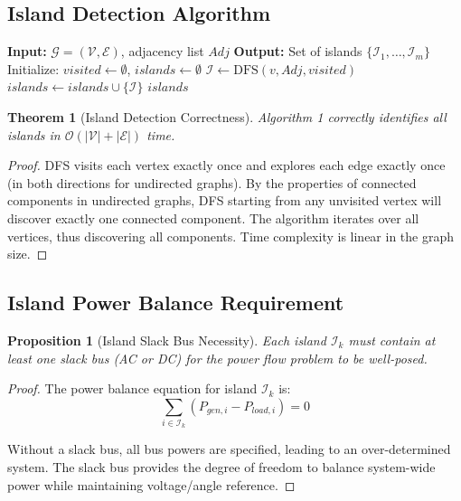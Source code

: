 \documentclass[11pt]{article}
\newtheorem{theorem}{Theorem}
\newtheorem{proposition}{Proposition}
\begin{document}
\subsection{Island Detection Algorithm}

\begin{algorithm}
\caption{Depth-First Search for Island Detection}
\begin{algorithmic}[1]
\STATE \textbf{Input:} $\mathcal{G} = (\mathcal{V}, \mathcal{E})$, adjacency list $Adj$
\STATE \textbf{Output:} Set of islands $\{\mathcal{I}_1, \ldots, \mathcal{I}_m\}$
\STATE Initialize: $visited \leftarrow \emptyset$, $islands \leftarrow \emptyset$
        \STATE $\mathcal{I} \leftarrow \text{DFS}(v, Adj, visited)$
        \STATE $islands \leftarrow islands \cup \{\mathcal{I}\}$
    \ENDIF
\ENDFOR
\RETURN $islands$
\end{algorithmic}
\end{algorithm}

\begin{theorem}[Island Detection Correctness]
Algorithm 1 correctly identifies all islands in $\mathcal{O}(|\mathcal{V}| + |\mathcal{E}|)$ time.
\end{theorem}

\begin{proof}
DFS visits each vertex exactly once and explores each edge exactly once (in both directions for undirected graphs). By the properties of connected components in undirected graphs, DFS starting from any unvisited vertex will discover exactly one connected component. The algorithm iterates over all vertices, thus discovering all components. Time complexity is linear in the graph size.
\end{proof}

\subsection{Island Power Balance Requirement}

\begin{proposition}[Island Slack Bus Necessity]
Each island $\mathcal{I}_k$ must contain at least one slack bus (AC or DC) for the power flow problem to be well-posed.
\end{proposition}

\begin{proof}
The power balance equation for island $\mathcal{I}_k$ is:
\begin{equation}
\sum_{i \in \mathcal{I}_k} (P_{gen,i} - P_{load,i}) = 0
\end{equation}

Without a slack bus, all bus powers are specified, leading to an over-determined system. The slack bus provides the degree of freedom to balance system-wide power while maintaining voltage/angle reference.
\end{proof}
\end{document}
